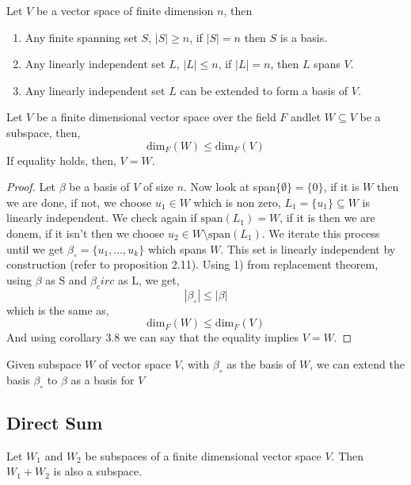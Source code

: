 \documentclass[11pt,a4paper]{colorart}
\def\l{\left}
\def\r{\right}
\def\es{\emptyset}
\def\b{\beta}
\begin{document}
\begin{corollary}
	Let $V$ be a vector space of finite dimension $n$, then
	\begin{enumerate}
		\item Any finite spanning set $S$, $|S|\geq n$, if $|S|=n$ then $S$ is a basis.
		\item Any linearly independent set $L$, $|L|\leq n$, if $|L|=n$, then $L$ spans $V$.
		\item Any linearly independent set $L$ can be extended to form a basis of $V$.
	\end{enumerate}
\end{corollary}

\begin{corollary}
	Let $V$ be a finite dimensional vector space over the field $F$ andlet $W\subseteq V$ be a subspace, then,
	\[ \text{dim}_F\l(W\r) \leq \text{dim}_F \l(V\r) \]
	If equality holds, then, $V=W$.
\end{corollary}

\begin{proof}
	Let $\b$ be a basis of $V$ of size $n$. Now look at span$\{\es\} = \{0\}$, if it is $W$ then we are done, if not, we choose $u_1\in W$ which is non zero, $L_1 = \{u_1\}\subseteq W$ is linearly independent. We check again if $\text{span}\l(L_1\r)=W $, if it is then we are donem, if it isn't then we choose $u_2\in W \setminus \text{span}\l(L_1\r)$. We iterate this process until we get $\b_\circ = \{u_1,\dots,u_k\}$ which spans $W$. This set is linearly independent by construction (refer to proposition 2.11). Using 1) from replacement theorem, using $\b$ as S and $\b_circ$ as L, we get,
	\[ |\b_\circ| \leq |\b| \]
	which is the same as,
	\[ \text{dim}_F\l(W\r) \leq \text{dim}_F \l(V\r) \]
	And using corollary 3.8 we can say that the equality implies $V=W$.	
\end{proof}

\begin{remark}
	Given subspace $W$ of vector space $V$, with $\b_\circ$ as the basis of $W$, we can extend the basis $\b_\circ$ to $\b$ as a basis for $V$
\end{remark}

\subsection{Direct Sum}

Let $W_1$ and $W_2$ be subspaces of a finite dimensional vector space $V$. Then $W_1+W_2$ is also a subspace.
\end{document}
